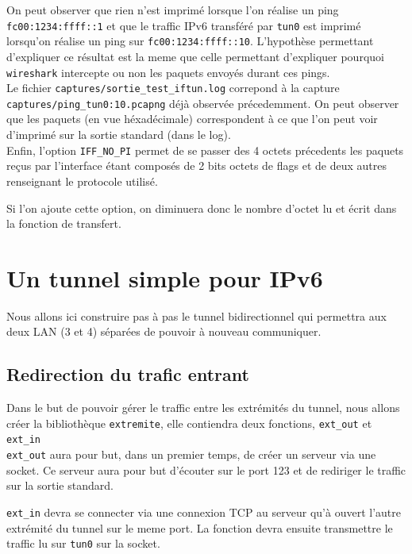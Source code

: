 \documentclass[a4paper, 10pt]{article}
\begin{document}
      On peut observer que rien n'est imprimé lorsque l'on réalise un ping
      \verb+fc00:1234:ffff::1+ et que le traffic IPv6 transféré par \verb+tun0+
      est imprimé lorsqu'on réalise un ping sur \verb+fc00:1234:ffff::10+.
      L'hypothèse permettant d'expliquer ce résultat est la meme que celle
      permettant d'expliquer pourquoi \verb+wireshark+ intercepte ou non les
      paquets envoyés durant ces pings. \\

      Le fichier \verb+captures/sortie_test_iftun.log+ correpond à la capture
      \verb+captures/ping_tun0:10.pcapng+ déjà observée précedemment. On peut
      observer que les paquets (en vue héxadécimale) correspondent à ce que l'on
      peut voir d'imprimé sur la sortie standard (dans le log). \\

      Enfin, l'option \verb+IFF_NO_PI+ permet de se passer des 4 octets
      précedents les paquets reçus par l'interface étant composés de 2 bits
      octets de flags et de deux autres renseignant le protocole utilisé.

      Si l'on ajoute cette option, on diminuera donc le nombre d'octet lu et
      écrit dans la fonction de transfert.

  \section{Un tunnel simple pour IPv6}
    Nous allons ici construire pas à pas le tunnel bidirectionnel qui permettra
    aux deux LAN (3 et 4) séparées de pouvoir à nouveau communiquer.

    \subsection{Redirection du trafic entrant}
      Dans le but de pouvoir gérer le traffic entre les extrémités du tunnel,
      nous allons créer la bibliothèque \verb+extremite+, elle contiendra deux
      fonctions, \verb+ext_out+ et \verb+ext_in+ \\

      \verb+ext_out+ aura pour but, dans un premier temps, de créer un serveur
      via une socket. Ce serveur aura pour but d'écouter sur le port 123 et de
      rediriger le traffic sur la sortie standard.

      \verb+ext_in+ devra se connecter via une connexion TCP au serveur qu'à
      ouvert l'autre extrémité du tunnel sur le meme port. La fonction devra
      ensuite transmettre le traffic lu sur \verb+tun0+ sur la socket. \\
\end{document}
